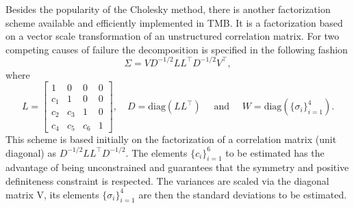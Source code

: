 Besides the popularity of the Cholesky method, there is another
factorization scheme available and efficiently implemented in TMB. It is
a factorization based on a vector scale transformation of an
unstructured correlation matrix. For two competing causes of failure the
decomposition is specified in the following fashion
\[
  \Sigma = VD^{-1/2}LL^{\top}D^{-1/2}V^{\top},
\]
where
\[
 L = \begin{bmatrix}
      1&0&0&0\\
      c_{1}&1&0&0\\
      c_{2}&c_{3}&1&0\\
      c_{4}&c_{5}&c_{6}&1
     \end{bmatrix},\quad D = \text{diag}(LL^{\top})
 \quad\text{ and }\quad W = \text{diag}(\{\sigma_{i}\}_{i=1}^{4}).
\]
This scheme is based initially on the factorization of a correlation
matrix (unit diagonal) as \(D^{-1/2}LL^{\top}D^{-1/2}\). The elements
\(\{c_{i}\}_{i=1}^{6}\) to be estimated has the advantage of being
unconstrained and guarantees that the symmetry and positive definiteness
constraint is respected. The variances are scaled via the diagonal
matrix V, its elements \(\{\sigma_{i}\}_{i=1}^{4}\) are then the
standard deviations to be estimated.

